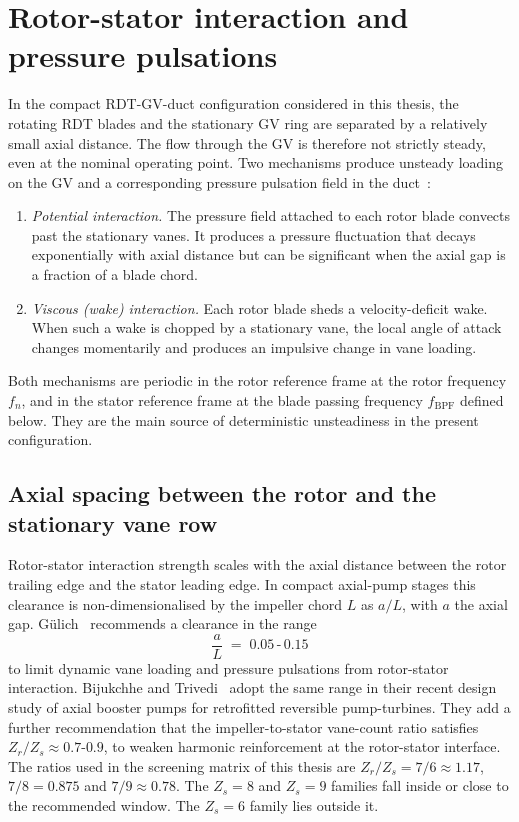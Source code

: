 \section{Rotor-stator interaction and pressure pulsations}
\label{sec:rsi}
 
In the compact RDT-GV-duct configuration considered in this thesis, the rotating RDT blades and the stationary GV ring are separated by a relatively small axial distance. The flow through the GV is therefore not strictly steady, even at the nominal operating point. Two mechanisms produce unsteady loading on the GV and a corresponding pressure pulsation field in the duct~\cite{Brekke2015, Arndt1990}:
\begin{enumerate}
  \item \emph{Potential interaction.} The pressure field attached to each rotor blade convects past the stationary vanes. It produces a pressure fluctuation that decays exponentially with axial distance but can be significant when the axial gap is a fraction of a blade chord.
  \item \emph{Viscous (wake) interaction.} Each rotor blade sheds a velocity-deficit wake. When such a wake is chopped by a stationary vane, the local angle of attack changes momentarily and produces an impulsive change in vane loading.
\end{enumerate}
Both mechanisms are periodic in the rotor reference frame at the rotor frequency $f_n$, and in the stator reference frame at the blade passing frequency $f_{\mathrm{BPF}}$ defined below. They are the main source of deterministic unsteadiness in the present configuration.

\subsection{Axial spacing between the rotor and the stationary vane row}
\label{sec:rsi-axial-spacing}

Rotor-stator interaction strength scales with the axial distance between the rotor trailing edge and the stator leading edge. In compact axial-pump stages this clearance is non-dimensionalised by the impeller chord $L$ as $a/L$, with $a$ the axial gap. G\"ulich~\cite{Gulich2010} recommends a clearance in the range
\begin{equation}
    \frac{a}{L} \;=\; 0.05\,\text{-}\,0.15
    \label{eq:gulich_a_over_L}
\end{equation}
to limit dynamic vane loading and pressure pulsations from rotor-stator interaction. Bijukchhe and Trivedi~\cite{Bijukchhe2026} adopt the same range in their recent design study of axial booster pumps for retrofitted reversible pump-turbines. They add a further recommendation that the impeller-to-stator vane-count ratio satisfies $Z_r/Z_s \approx 0.7$-$0.9$, to weaken harmonic reinforcement at the rotor-stator interface. The ratios used in the screening matrix of this thesis are $Z_r/Z_s = 7/6 \approx 1.17$, $7/8 = 0.875$ and $7/9 \approx 0.78$. The $Z_s = 8$ and $Z_s = 9$ families fall inside or close to the recommended window. The $Z_s = 6$ family lies outside it.

